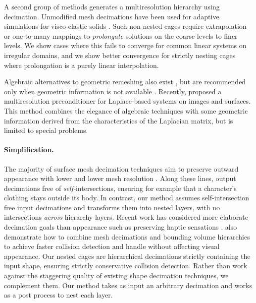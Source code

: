 A second group of methods generates a multiresolution hierarchy using
decimation. Unmodified mesh decimations \cite{Garland:1997:SSU} have been used
for adaptive simulations for visco-elastic solids \cite{Debunne:2001:DRD}.
%
Such non-nested cages require extrapolation or one-to-many mappings to
\emph{prolongate} solutions on the coarse levels to finer levels.
%
We show cases where this fails to converge for common linear systems on
irregular domains, and we show better convergence for strictly nesting cages
where prolongation is a purely linear interpolation.

Algebraic alternatives to geometric remeshing also exist
\cite{ruge1987algebraic},
but are recommended only when geometric information is not available
\cite{falgout06}.
%
Recently, \cite{Krishnan:2013:EPL} proposed a
multiresolution preconditioner for Laplace-based systems on images and
surfaces.
%
This method combines the elegance of algebraic techniques with some geometric
information derived from the characteristics of the Laplacian matrix, but is
limited to special problems.




\paragraph{Simplification.}
%
The majority of surface mesh decimation techniques aim to preserve outward
appearance with lower and lower mesh resolution
\cite{Hoppe:1996:PM,Garland:1997:SSU,Melax98}.
%
Along these lines, \cite{gumhold2003intersection} output
decimations free of \emph{self-}intersections, ensuring for example that a
character's clothing stays outside its body.
%
In contrast, our method assumes self-intersection free input decimations and
transforms them into nested layers, with no intersections \emph{across}
hierarchy layers.
%
Recent work has considered more elaborate decimation goals than appearance such
as preserving haptic sensations \cite{Otaduy:2003:SPS}.
%
\cite{Otaduy:2003:CDH} also demonstrate how to combine mesh decimations and bounding
volume hierarchies to achieve faster collision detection and handle without
affecting visual appearance.
%
Our nested cages are hierarchical decimations strictly containing the input
shape, ensuring strictly conservative collision detection.
%
Rather than work against the staggering quality of existing shape decimation
techniques, we complement them. Our method takes as input an arbitrary
decimation and works as a post process to nest each layer.

